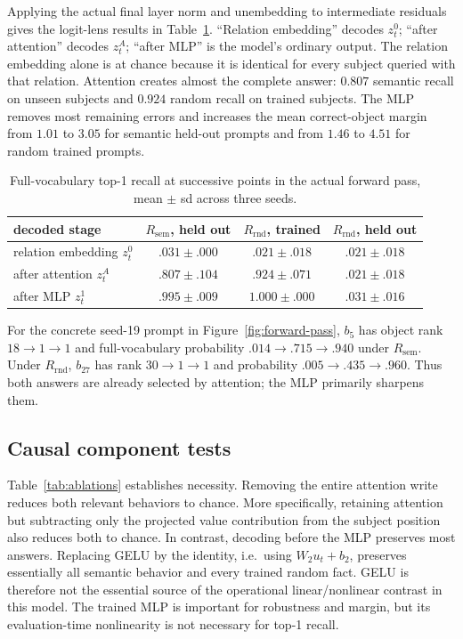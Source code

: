 \documentclass[11pt]{article}
\newcommand{\Rsem}{R_{\mathrm{sem}}}
\newcommand{\Rrnd}{R_{\mathrm{rnd}}}
\begin{document}
Applying the actual final layer norm and unembedding to intermediate residuals gives the logit-lens results in Table~\ref{tab:stages}. ``Relation embedding'' decodes $z_t^0$; ``after attention'' decodes $z_t^A$; ``after MLP'' is the model's ordinary output. The relation embedding alone is at chance because it is identical for every subject queried with that relation. Attention creates almost the complete answer: $0.807$ semantic recall on unseen subjects and $0.924$ random recall on trained subjects. The MLP removes most remaining errors and increases the mean correct-object margin from $1.01$ to $3.05$ for semantic held-out prompts and from $1.46$ to $4.51$ for random trained prompts.

\begin{table}[htbp]
\centering
\begin{tabular}{lccc}
\toprule
decoded stage & $\Rsem$, held out & $\Rrnd$, trained & $\Rrnd$, held out\\
\midrule
relation embedding $z_t^0$ & $.031 \pm .000$ & $.021 \pm .018$ & $.021 \pm .018$\\
after attention $z_t^A$ & $.807 \pm .104$ & $.924 \pm .071$ & $.021 \pm .018$\\
after MLP $z_t^1$ & $.995 \pm .009$ & $1.000 \pm .000$ & $.031 \pm .016$\\
\bottomrule
\end{tabular}
\caption{Full-vocabulary top-1 recall at successive points in the actual forward pass, mean $\pm$ sd across three seeds.}
\label{tab:stages}
\end{table}

For the concrete seed-19 prompt in Figure~\ref{fig:forward-pass}, $b_5$ has object rank $18\to1\to1$ and full-vocabulary probability $.014\to.715\to.940$ under $\Rsem$. Under $\Rrnd$, $b_{27}$ has rank $30\to1\to1$ and probability $.005\to.435\to.960$. Thus both answers are already selected by attention; the MLP primarily sharpens them.

\subsection{Causal component tests}

Table~\ref{tab:ablations} establishes necessity. Removing the entire attention write reduces both relevant behaviors to chance. More specifically, retaining attention but subtracting only the projected value contribution from the subject position also reduces both to chance. In contrast, decoding before the MLP preserves most answers. Replacing GELU by the identity, i.e.\ using $W_2u_t+b_2$, preserves essentially all semantic behavior and every trained random fact. GELU is therefore not the essential source of the operational linear/nonlinear contrast in this model. The trained MLP is important for robustness and margin, but its evaluation-time nonlinearity is not necessary for top-1 recall.
\end{document}
